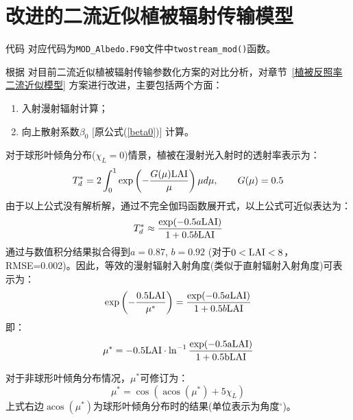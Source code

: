 \section{改进的二流近似植被辐射传输模型}\label{sec:改进的二流近似植被辐射传输模型}
\begin{mymdframed}{代码}
对应代码为\texttt{MOD\_Albedo.F90}文件中\texttt{twostream\_mod()}函数。
\end{mymdframed}
根据 \citet{yuan2017reexamination} 对目前二流近似植被辐射传输参数化方案的对比分析，对章节~\ref{植被反照率二流近似模型} 方案进行改进，主要包括两个方面：
\begin{enumerate}
    \item 入射漫射辐射计算；
    \item 向上散射系数$\beta_0$ [原公式(\ref{beta0})] 计算。
\end{enumerate}

对于球形叶倾角分布($\chi_L=0$)情景，植被在漫射光入射时的透射率表示为：
\begin{equation}
T_{d}^{*}=2 \int_{0}^{1} \exp \left(-\frac{G(\mu) \rm LAI}{\mu}\right) \mu d \mu, \qquad G(\mu)=0.5
\end{equation}
由于以上公式没有解析解，通过不完全伽玛函数展开式，以上公式可近似表达为：
\begin{equation}
T_{d}^{*} \approx \frac{\exp (-0.5 a \rm LAI)}{1+0.5 b \rm LAI}
\end{equation}
通过与数值积分结果拟合得到$a=0.87$, $b=0.92$ (对于$0<\rm LAI<8$，RMSE=0.002)。因此，等效的漫射辐射入射角度(类似于直射辐射入射角度)可表示为：
\begin{equation}
\exp \left(-\frac{0.5 \rm LAI}{\mu^{*}}\right)=\frac{\exp (-0.5 a \rm LAI)}{1+0.5 b \rm LAI}
\end{equation}
即：
\begin{equation}
\mu^{*}=-0.5 \rm LAI \cdot \ln ^{-1} \frac{\exp (-0.5 a \rm LAI)}{1+0.5 b \rm LAI}
\end{equation}

对于非球形叶倾角分布情况，$\mu^\ast$可修订为：
\begin{equation}
\mu^{*}=\cos \left(\operatorname{acos}\left(\mu^{*}\right)+5 \chi_{L}\right)
\end{equation}
上式右边$\operatorname{acos}\left(\mu^{*}\right)$为球形叶倾角分布时的结果(单位表示为角度$^{\circ}$)。


